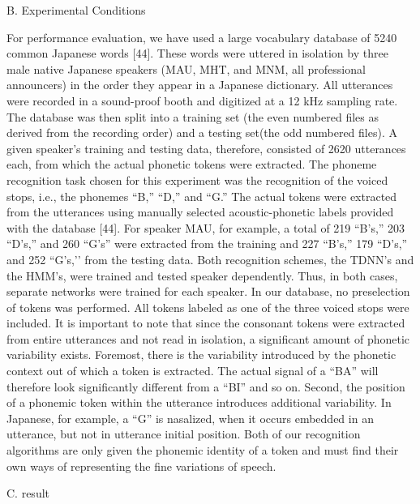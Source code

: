 B. Experimental Conditions

For performance evaluation, we have used a large vocabulary database of 5240 common Japanese words [44].
These words were uttered in isolation by three male native Japanese speakers (MAU, MHT, and MNM, all professional announcers) in the order they appear in a Japanese dictionary. 
All utterances were recorded in a sound-proof booth and digitized at a 12 kHz sampling rate. The database was then split into a training set (the even numbered files as derived from the recording order) and a testing set(the odd numbered files). 
A given speaker’s training and testing data, therefore, consisted of 2620 utterances each, from which the actual phonetic tokens were extracted.
The phoneme recognition task chosen for this experiment was the recognition of the voiced stops, i.e., the phonemes “B,” “D,” and “G.” The actual tokens were extracted from the utterances using manually selected acoustic-phonetic labels provided with the database [44].
For speaker MAU, for example, a total of 219 “B’s,” 203 “D’s,” and 260 “G’s” were extracted from the training and 227 “B’s,” 179 “D’s,” and 252 “G’s,’’ from the testing data. 
Both recognition schemes, the TDNN’s and the HMM’s, were trained and tested speaker dependently. 
Thus, in both cases, separate networks were trained for each speaker.
In our database, no preselection of tokens was performed. 
All tokens labeled as one of the three voiced stops were included. 
It is important to note that since the consonant tokens were extracted from entire utterances and not read in isolation, a significant amount of phonetic variability exists. 
Foremost, there is the variability introduced by the phonetic context out of which a token is extracted. 
The actual signal of a “BA” will therefore look significantly different from a “BI” and so on. Second, the position of a phonemic token within the utterance introduces additional variability. 
In Japanese, for example, a “G” is nasalized, when it occurs embedded in an utterance, but not in utterance initial position. 
Both of our recognition algorithms are only given the phonemic identity of a token and must find their own ways of representing the fine variations of speech.

C. result

